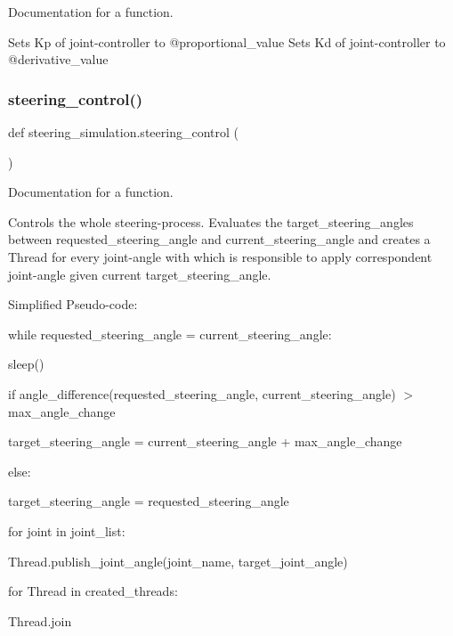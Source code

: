 Documentation for a function. 

Sets Kp of joint-\/controller to @proportional\+\_\+value Sets Kd of joint-\/controller to @derivative\+\_\+value \mbox{\label{namespacesteering__simulation_a7e6cf517d5eedfae29bc0b05bada6a3e}} 
\subsubsection{\texorpdfstring{steering\_control()}{steering\_control()}}
{\footnotesize\ttfamily def steering\+\_\+simulation.\+steering\+\_\+control (\begin{DoxyParamCaption}{ }\end{DoxyParamCaption})}



Documentation for a function. 

Controls the whole steering-\/process. Evaluates the target\+\_\+steering\+\_\+angles between requested\+\_\+steering\+\_\+angle and current\+\_\+steering\+\_\+angle and creates a Thread for every joint-\/angle with which is responsible to apply correspondent joint-\/angle given current target\+\_\+steering\+\_\+angle.

Simplified Pseudo-\/code\+:

while requested\+\_\+steering\+\_\+angle = current\+\_\+steering\+\_\+angle\+: \begin{DoxyVerb}sleep()
\end{DoxyVerb}


if angle\+\_\+difference(requested\+\_\+steering\+\_\+angle, current\+\_\+steering\+\_\+angle) $>$ max\+\_\+angle\+\_\+change \begin{DoxyVerb}target_steering_angle = current_steering_angle + max_angle_change
\end{DoxyVerb}


else\+: \begin{DoxyVerb}target_steering_angle = requested_steering_angle
\end{DoxyVerb}


for joint in joint\+\_\+list\+: \begin{DoxyVerb}Thread.publish_joint_angle(joint_name, target_joint_angle)
\end{DoxyVerb}


for Thread in created\+\_\+threads\+: \begin{DoxyVerb}    Thread.join
\end{DoxyVerb}


